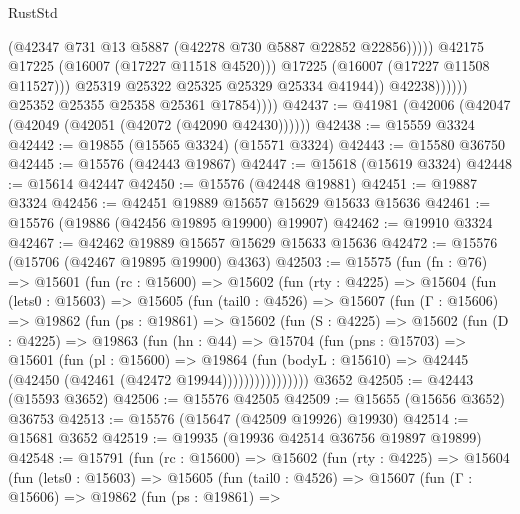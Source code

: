 \begin{lexlean}{RustStd}
\begin{coremodule}
                                      (@42347 @731 @13 @5887 (@42278 @730 @5887 @22852 @22856)))))
                                @42175
                                @17225
                                (@16007 (@17227 @11518 @4520)))
                              @17225
                              (@16007 (@17227 @11508 @11527)))
                            @25319
                            @25322
                            @25325
                            @25329
                            @25334
                            @41944))
                        @42238))))))
            @25352
            @25355
            @25358
            @25361
            @17854))))
@42437 := @41981 (@42006 (@42047 (@42049 (@42051 (@42072 (@42090 @42430))))))
@42438 := @15559 @3324
@42442 := @19855 (@15565 @3324) (@15571 @3324)
@42443 := @15580 @36750
@42445 := @15576 (@42443 @19867)
@42447 := @15618 (@15619 @3324)
@42448 := @15614 @42447
@42450 := @15576 (@42448 @19881)
@42451 := @19887 @3324
@42456 := @42451 @19889 @15657 @15629 @15633 @15636
@42461 := @15576 (@19886 (@42456 @19895 @19900) @19907)
@42462 := @19910 @3324
@42467 := @42462 @19889 @15657 @15629 @15633 @15636
@42472 := @15576 (@15706 (@42467 @19895 @19900) @4363)
@42503 := @15575
    (fun (fn : @76) =>
    @15601
      (fun (rc : @15600) =>
      @15602
        (fun (rty : @4225) =>
        @15604
          (fun (lets0 : @15603) =>
          @15605
            (fun (tail0 : @4526) =>
            @15607
              (fun (Γ : @15606) =>
              @19862
                (fun (ps : @19861) =>
                @15602
                  (fun (S : @4225) =>
                  @15602
                    (fun (D : @4225) =>
                    @19863
                      (fun (hn : @44) =>
                      @15704
                        (fun (pns : @15703) =>
                        @15601
                          (fun (pl : @15600) =>
                          @19864
                            (fun (bodyL : @15610) =>
                            @42445 (@42450 (@42461 (@42472 @19944))))))))))))))))
    @3652
@42505 := @42443 (@15593 @3652)
@42506 := @15576 @42505
@42509 := @15655 (@15656 @3652) @36753
@42513 := @15576 (@15647 (@42509 @19926) @19930)
@42514 := @15681 @3652
@42519 := @19935 (@19936 @42514 @36756 @19897 @19899)
@42548 := @15791
    (fun (rc : @15600) =>
    @15602
      (fun (rty : @4225) =>
      @15604
        (fun (lets0 : @15603) =>
        @15605
          (fun (tail0 : @4526) =>
          @15607
            (fun (Γ : @15606) =>
            @19862
              (fun (ps : @19861) =>

\end{coremodule}
\end{lexlean}
